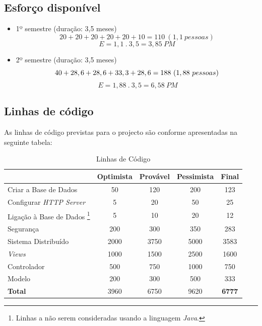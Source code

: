 \documentclass[12pt, a4paper, twoside]{report} %
\begin{document}
\subsection{Esforço disponível}

\begin{itemize}

\item 1º semestre (duração: 3,5 meses)
\begin{equation}
20+20+20+20+20+10 = 110 \ (1,1 \ pessoas)
\end{equation}
\begin{equation}
E = 1,1 \ . \ 3,5 = 3,85 \ PM
\end{equation}
\item 2º semestre (duração: 3,5 meses)
\begin{equation}
40+28,6+28,6+33,3+28,6 = 188 \ (1,88 \ pessoas)\\
\end{equation}
\begin{equation}
\ E = 1,88 \ . \ 3,5 = 6, 58 \ PM
\end{equation}
\end{itemize}

\subsection{Linhas de código}

As linhas de código previstas para o projecto são conforme apresentadas na seguinte tabela:

\begin{savenotes}
\begin{table}[h]
\centering
\begin{tabular}{|l|c c c c|}
\hline
										& Optimista & Provável & Pessimista & \textbf{Final} \\ \hline
Criar a Base de Dados  					& 50        & 120      & 200        & 123   		 \\ \hline
Configurar \textit{HTTP Server} 		& 5         & 20       & 50         & 25    		 \\ \hline
Ligação à Base de Dados \footnote{Linhas a não serem consideradas usando a linguagem \textit{Java}.}
										& 5         & 10       & 20         & 12    		 \\ \hline
Segurança              					& 200       & 300      & 350        & 283   		 \\ \hline
Sistema Distribuído\footnotemark	    & 2000      & 3750     & 5000       & 3583   		 \\ \hline
\textit{Views}            				& 1000      & 1500     & 2500       & 1600  		 \\ \hline
Controlador                 			& 500       & 750      & 1000       & 750   		 \\ \hline
Modelo                      			& 200       & 300      & 500        & 333   		 \\ \hline
\textbf{Total}		   					& 3960      & 6750     & 9620       & \textbf{6777}  \\ \hline
\end{tabular}
\caption{Linhas de Código}
\label{codigo}
\end{table}%
\end{savenotes}
\end{document}
